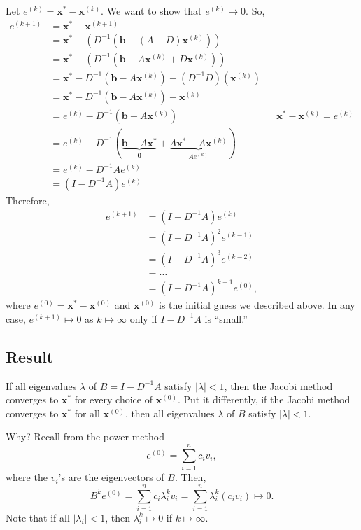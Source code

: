 \documentclass[letterpaper]{article}
\newcommand{\0}{\mathbf{0}}
\renewcommand{\b}{\mathbf{b}}
\newcommand{\x}{\mathbf{x}}
\begin{document}
\bigskip 

Let $e^{(k)} = \x^* - \x^{(k)}$. We want to show that $e^{(k)} \mapsto 0$. So, 
\begin{equation*}
    \begin{aligned}
        e^{(k + 1)} &= \x^* - \x^{(k + 1)} \\ 
            &= \x^* - (D^{-1} (\b - (A - D)\x^{(k)})) \\ 
            &= \x^* - (D^{-1} (\b - A\x^{(k)} + D\x^{(k)})) \\ 
            &= \x^* - D^{-1} (\b - A\x^{(k)}) - (D^{-1}D)(\x^{(k)}) \\ 
            &= \x^* - D^{-1} (\b - A\x^{(k)}) - \x^{(k)} \\ 
            &= e^{(k)} - D^{-1} (\b - A\x^{(k)}) && \x^* - \x^{(k)} = e^{(k)} \\
            &= e^{(k)} - D^{-1} (\underbrace{\b - A\x^*}_{\0} + \underbrace{A\x^* - A\x^{(k)}}_{Ae^{(k)}}) \\ 
            &= e^{(k)} - D^{-1}Ae^{(k)} \\ 
            &= (I - D^{-1}A)e^{(k)} 
    \end{aligned}
\end{equation*}
Therefore, 
\begin{equation*}
    \begin{aligned}
        e^{(k + 1)} &= (I - D^{-1}A)e^{(k)}  \\ 
            &= (I - D^{-1} A)^2 e^{(k - 1)} \\ 
            &= (I - D^{-1} A)^3 e^{(k - 2)} \\ 
            &= \hdots \\ 
            &= (I - D^{-1} A)^{k + 1} e^{(0)},
    \end{aligned}
\end{equation*}
where $e^{(0)} = \x^* - \x^{(0)}$ and $\x^{(0)}$ is the initial guess we described above. In any case, $e^{(k + 1)} \mapsto 0$ as $k \mapsto \infty$ only if $I - D^{-1}A$ is ``small.''

\subsection{Result}
If all eigenvalues $\lambda$ of $B = I - D^{-1}A$ satisfy $|\lambda| < 1$, then the Jacobi method converges to $\x^*$ for every choice of $\x^{(0)}$. Put it differently, if the Jacobi method converges to $\x^*$ for all $\x^{(0)}$, then all eigenvalues $\lambda$ of $B$ satisfy $|\lambda| < 1$. 

\bigskip 

Why? Recall from the power method 
\[e^{(0)} = \sum_{i = 1}^{n} c_i v_i,\]
where the $v_i$'s are the eigenvectors of $B$. Then, 
\[B^k e^{(0)} = \sum_{i = 1}^{n} c_i \lambda_i^k v_i = \sum_{i = 1}^{n} \lambda_i^k (c_i v_i) \mapsto 0.\] Note that if all $|\lambda_i| < 1$, then $\lambda_i^k \mapsto 0$ if $k \mapsto \infty$.  
\end{document}
